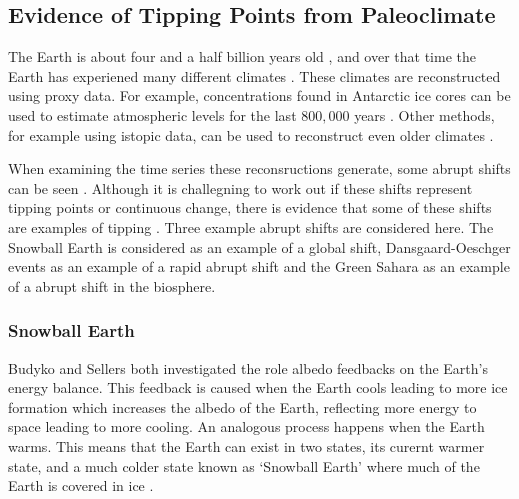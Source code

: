 \subsection{Evidence of Tipping Points from Paleoclimate}
The Earth is about four and a half billion years old \parencite{Dalrymple2001}, and over that time the Earth has experiened many different climates \parencite{Alley2003}.
These climates are reconstructed using proxy data. For example,  concentrations found in Antarctic ice cores can be used to estimate atmospheric  levels for the
last $800,000$ years \parencite{Bereiter2014}. Other methods, for example using istopic data, can be used to reconstruct even older climates \parencite{Tierney2020}.

When examining the time series these reconsructions generate, some abrupt shifts can be seen \parencite{Boers2022,Brovkin2021}. Although it is challegning to work out if these
shifts represent tipping points or continuous change, there is evidence that some of these shifts are examples of tipping \parencite{Dakos2008}. Three example abrupt shifts are considered here.
The Snowball Earth is considered as an example of a global shift, Dansgaard-Oeschger events as an example of a rapid abrupt shift and the Green Sahara as an example of a abrupt shift in
the biosphere.

\subsubsection{Snowball Earth}
Budyko and Sellers \parencite{Budyko1969,Sellers1969} both investigated the role albedo feedbacks on the Earth's energy balance. This feedback is caused when the Earth cools leading to more
ice formation which increases the albedo of the Earth, reflecting more energy to space leading to more cooling. An analogous process happens when the Earth warms. This means that the
Earth can exist in two states, its curernt warmer state, and a much colder state known as `Snowball Earth' where much of the Earth is covered in ice \parencite{Ghil1976,Held1974}. 


